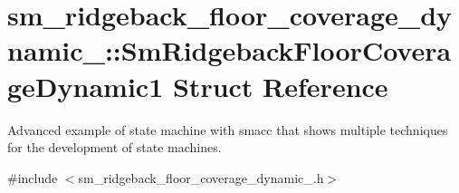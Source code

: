 \hypertarget{structsm__ridgeback__floor__coverage__dynamic__1_1_1SmRidgebackFloorCoverageDynamic1}{}\section{sm\+\_\+ridgeback\+\_\+floor\+\_\+coverage\+\_\+dynamic\+\_\+:\+:Sm\+Ridgeback\+Floor\+Coverage\+Dynamic1 Struct Reference}
\label{structsm__ridgeback__floor__coverage__dynamic__1_1_1SmRidgebackFloorCoverageDynamic1}


Advanced example of state machine with smacc that shows multiple techniques for the development of state machines.  




{\ttfamily \#include $<$sm\+\_\+ridgeback\+\_\+floor\+\_\+coverage\+\_\+dynamic\+\_.\+h$>$}




